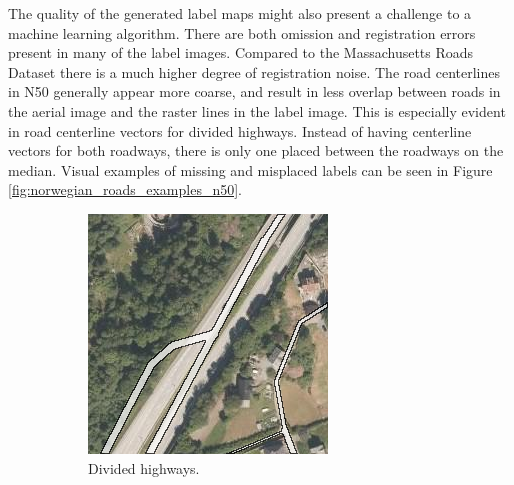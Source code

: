 The quality of the generated label maps might also present a challenge to a machine learning algorithm. There are both omission and registration errors present in many of the label images. Compared to the Massachusetts Roads Dataset there is a much higher degree of registration noise. The road centerlines in N50 generally appear more coarse, and result in less overlap between roads in the aerial image and the raster lines in the label image. This is especially evident in road centerline vectors for divided highways. Instead of having centerline vectors for both roadways, there is only one placed between the roadways on the median. Visual examples of missing and misplaced labels can be seen in Figure \ref{fig:norwegian_roads_examples_n50}.\\

\begin{figure}[h]
\begin{subfigure}{0.31\textwidth}
\includegraphics[width=\linewidth]{figs/datasets/nor_examples/1191_highway_n50.png}
\caption{Divided highways.} \label{fig:norwegian_roads_highway_n50}
\end{subfigure}
\hspace*{\fill} %
\begin{subfigure}{0.31\textwidth}

\end{subfigure}
\end{figure}
